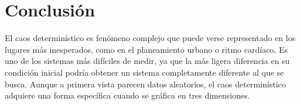 \documentclass{article}
\begin{document}
\section{Conclusión}
El caos determinístico es fenómeno complejo que puede verse representado en los lugares más inesperados, como en el planeamiento urbano o ritmo cardíaco. Es uno de los sistemas más difíciles de medir, ya que la más ligera diferencia en su condición inicial podría obtener un sistema completamente diferente al que se busca. Aunque a primera vista parecen datos aleatorios, el caos determinístico adquiere una forma específica cuando se gráfica en tres dimensiones.
\end{document}
